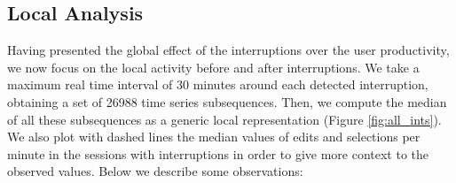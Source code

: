 \documentclass[times]{smrauth}
\begin{document}
\subsection{Local Analysis}

Having presented the global effect of the interruptions over the user productivity, we now focus on the local activity before and after interruptions. We take a maximum real time interval of 30 minutes around each detected interruption, obtaining a set of 26988 time series subsequences. Then, we compute the median of all these subsequences as a generic local representation (Figure \ref{fig:all_ints}). We also plot with dashed lines the median values of edits and selections per minute in the sessions with interruptions in order to give more context to the observed values.
Below we describe some observations:
\end{document}

